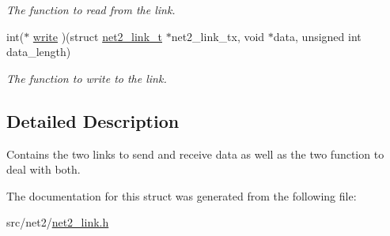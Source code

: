 \begin{DoxyCompactItemize}
\begin{DoxyCompactList}\small\item\em The function to read from the link. \end{DoxyCompactList}\item 
\hypertarget{structnet2__link__t_ac1513cd0177b78d51e564224be84ef01}{int($\ast$ \hyperlink{structnet2__link__t_ac1513cd0177b78d51e564224be84ef01}{write} )(struct \hyperlink{structnet2__link__t}{net2\-\_\-link\-\_\-t} $\ast$net2\-\_\-link\-\_\-tx, void $\ast$data, unsigned int data\-\_\-length)}\label{structnet2__link__t_ac1513cd0177b78d51e564224be84ef01}

\begin{DoxyCompactList}\small\item\em The function to write to the link. \end{DoxyCompactList}\end{DoxyCompactItemize}


\subsection{Detailed Description}
Contains the two links to send and receive data as well as the two function to deal with both. 

The documentation for this struct was generated from the following file\-:\begin{DoxyCompactItemize}
\item 
src/net2/\hyperlink{net2__link_8h}{net2\-\_\-link.\-h}\end{DoxyCompactItemize}
